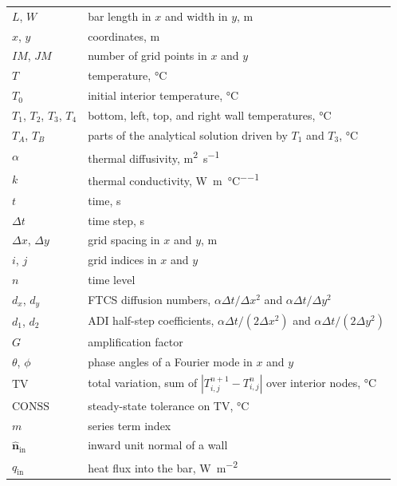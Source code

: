 \documentclass[conf]{new-aiaa}
\begin{document}
{\renewcommand\arraystretch{1.0}
\noindent\begin{longtable*}{@{}l @{\quad=\quad} l@{}}
$L$, $W$ & bar length in $x$ and width in $y$, \si{\metre} \\
$x$, $y$ & coordinates, \si{\metre} \\
$\mathit{IM}$, $\mathit{JM}$ & number of grid points in $x$ and $y$ \\
$T$ & temperature, \si{\degreeCelsius} \\
$T_0$ & initial interior temperature, \si{\degreeCelsius} \\
$T_1$, $T_2$, $T_3$, $T_4$ & bottom, left, top, and right wall temperatures, \si{\degreeCelsius} \\
$T_A$, $T_B$ & parts of the analytical solution driven by $T_1$ and $T_3$, \si{\degreeCelsius} \\
$\alpha$ & thermal diffusivity, \si{\metre\squared\per\second} \\
$k$ & thermal conductivity, \si{\watt\per\metre\per\degreeCelsius} \\
$t$ & time, \si{\second} \\
$\Delta t$ & time step, \si{\second} \\
$\Delta x$, $\Delta y$ & grid spacing in $x$ and $y$, \si{\metre} \\
$i$, $j$ & grid indices in $x$ and $y$ \\
$n$ & time level \\
$d_x$, $d_y$ & FTCS diffusion numbers, $\alpha\Delta t/\Delta x^2$ and $\alpha\Delta t/\Delta y^2$ \\
$d_1$, $d_2$ & ADI half-step coefficients, $\alpha\Delta t/(2\Delta x^2)$ and $\alpha\Delta t/(2\Delta y^2)$ \\
$G$ & amplification factor \\
$\theta$, $\phi$ & phase angles of a Fourier mode in $x$ and $y$ \\
$\mathrm{TV}$ & total variation, sum of $|T^{n+1}_{i,j} - T^{n}_{i,j}|$ over interior nodes, \si{\degreeCelsius} \\
$\mathrm{CONSS}$ & steady-state tolerance on TV, \si{\degreeCelsius} \\
$m$ & series term index \\
$\hat{\mathbf{n}}_{\mathrm{in}}$ & inward unit normal of a wall \\
$q_{\mathrm{in}}$ & heat flux into the bar, \si{\watt\per\metre\squared}
\end{longtable*}}
\setcounter{table}{0} %
\end{document}
